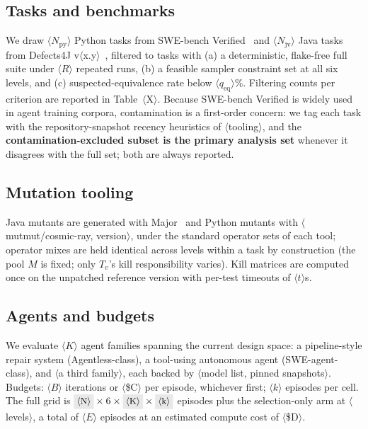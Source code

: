 \documentclass[conference]{IEEEtran}
\newcommand{\PH}[1]{\colorbox{gray!18}{\small$\langle$#1$\rangle$}}
\begin{document}
\subsection{Tasks and benchmarks}
We draw \PH{$N_{\mathrm{py}}$} Python tasks from SWE-bench
Verified~\cite{SWEbench_VTF8yNQM66} and \PH{$N_{\mathrm{jv}}$} Java
tasks from Defects4J v\PH{x.y}~\cite{Defects4J_Just2014}, filtered to
tasks with (a) a deterministic, flake-free full suite under \PH{$R$}
repeated runs, (b) a feasible sampler constraint set at all six levels,
and (c) suspected-equivalence rate below \PH{$q_{\mathrm{eq}}$}\%.
Filtering counts per criterion are reported in Table~\PH{X}. Because
SWE-bench Verified is widely used in agent training corpora,
contamination is a first-order concern: we tag each task with the
repository-snapshot recency heuristics of \PH{tooling}, and the
\textbf{contamination-excluded subset is the primary analysis set}
whenever it disagrees with the full set; both are always reported.

\subsection{Mutation tooling}
Java mutants are generated with Major~\cite{Just2011Major} and Python
mutants with \PH{mutmut/cosmic-ray, version}, under the standard
operator sets of each tool; operator mixes are held identical across
levels within a task by construction (the pool $M$ is fixed; only
$T_v$'s kill responsibility varies). Kill matrices are computed once on
the unpatched reference version with per-test timeouts of
\PH{$t$}s.

\subsection{Agents and budgets}
We evaluate \PH{$K$} agent families spanning the current design space:
a pipeline-style repair system (Agentless-class), a
tool-using autonomous agent (SWE-agent-class), and \PH{a third family},
each backed by \PH{model list, pinned snapshots}. Budgets:
\PH{$B$} iterations or \PH{\$C} per episode, whichever first;
\PH{$k$} episodes per cell. The full grid is
$\PH{N} \times 6 \times \PH{K} \times \PH{k}$ episodes plus the
selection-only arm at \PH{levels}, a total of \PH{$E$} episodes at an
estimated compute cost of \PH{\$D}.
\end{document}
